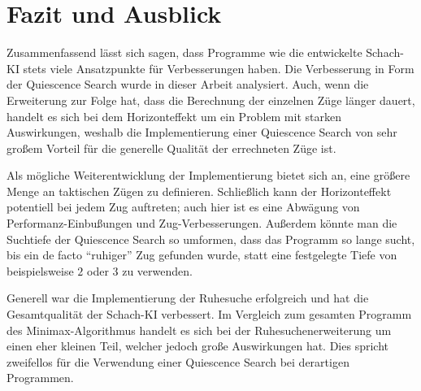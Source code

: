 
\chapter{Fazit und Ausblick}
Zusammenfassend lässt sich sagen, dass Programme wie die entwickelte Schach-KI stets viele Ansatzpunkte für Verbesserungen haben. Die Verbesserung in Form der Quiescence Search wurde in dieser Arbeit analysiert. Auch, wenn die Erweiterung zur Folge hat, dass die Berechnung der einzelnen Züge länger dauert, handelt es sich bei dem Horizonteffekt um ein Problem mit starken Auswirkungen, weshalb die Implementierung einer Quiescence Search von sehr großem Vorteil für die generelle Qualität der errechneten Züge ist.

Als mögliche Weiterentwicklung der Implementierung bietet sich an, eine größere Menge an taktischen Zügen zu definieren. Schließlich kann der Horizonteffekt potentiell bei jedem Zug auftreten; auch hier ist es eine Abwägung von Performanz-Einbußungen und Zug-Verbesserungen. Außerdem könnte man die Suchtiefe der Quiescence Search so umformen, dass das Programm so lange sucht, bis ein de facto "`ruhiger"' Zug gefunden wurde, statt eine festgelegte Tiefe von beispielsweise $2$ oder $3$ zu verwenden.

Generell war die Implementierung der Ruhesuche erfolgreich und hat die Gesamtqualität der Schach-KI verbessert. Im Vergleich zum gesamten Programm des Minimax-Algorithmus handelt es sich bei der Ruhesuchenerweiterung um einen eher kleinen Teil, welcher jedoch große Auswirkungen hat. Dies spricht zweifellos für die Verwendung einer Quiescence Search bei derartigen Programmen.